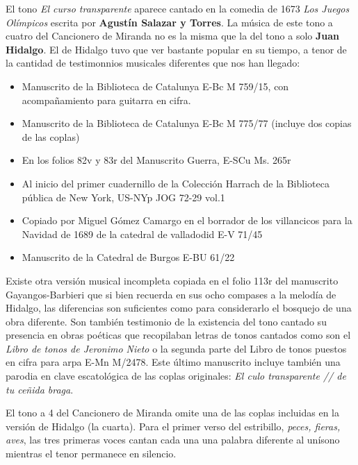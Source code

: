El tono \textit{El curso transparente} aparece cantado en la comedia de 1673 \textit{Los Juegos Olímpicos} escrita por \textbf{Agustín Salazar y Torres}. La música de este tono a cuatro del Cancionero de Miranda no es la misma que la del tono a solo \textbf{Juan Hidalgo}. El de Hidalgo tuvo que ver bastante popular en su tiempo, a tenor de la cantidad de testimonnios musicales diferentes que nos han llegado:
\begin{itemize}
	\item Manuscrito de la Biblioteca de Catalunya E-Bc M 759/15, con acompañamiento para guitarra en cifra.
	\item Manuscrito de la Biblioteca de Catalunya E-Bc M 775/77 (incluye dos copias de las coplas) 
	\item En los folios 82v y 83r del Manuscrito Guerra, E-SCu Ms. 265r
	\item Al inicio del primer cuadernillo de la Colección Harrach de la Biblioteca pública de New York, US-NYp JOG 72-29 vol.1
	\item Copiado por Miguel Gómez Camargo en el borrador de los villancicos para la Navidad de 1689 de la catedral de valladodid E-V 71/45
	\item Manuscrito de la Catedral de Burgos E-BU 61/22
\end{itemize}

Existe otra versión musical incompleta copiada en el folio 113r del manuscrito Gayangos-Barbieri que si bien recuerda en sus ocho compases a la melodía de Hidalgo, las diferencias son suficientes como para considerarlo el bosquejo de una obra diferente. Son también testimonio de la existencia del tono cantado su presencia en obras poéticas que recopilaban letras de tonos cantados como son el \textit{Libro de tonos de Jeronimo Nieto} o la segunda parte del Libro de tonos puestos en cifra para arpa E-Mn M/2478. Este último manuscrito incluye también una parodia en clave escatológica de las coplas originales: \textit{El culo transparente // de tu ceñida braga}.

El tono a 4 del Cancionero de Miranda omite una de las coplas incluidas en la versión de Hidalgo (la cuarta). Para el primer verso del estribillo, \textit{peces, fieras, aves}, las tres primeras voces cantan cada una una palabra diferente al unísono mientras el tenor permanece en silencio.

